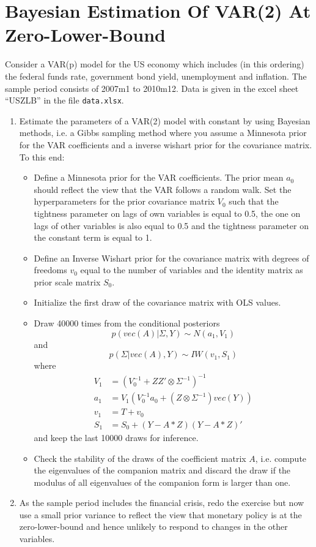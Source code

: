\documentclass[a4paper]{scrartcl}
\begin{document}
\section{Bayesian Estimation Of VAR(2) At Zero-Lower-Bound}
Consider a VAR(p) model for the US economy which includes (in this ordering) the federal funds rate, government bond yield, unemployment and inflation. The sample period consists of 2007m1 to 2010m12. Data is given in the excel sheet \enquote{USZLB} in the file \texttt{data.xlsx}.\\
\begin{enumerate}
	\item Estimate the parameters of a VAR(2) model with constant by using Bayesian methods, i.e. a Gibbs sampling method where you assume a Minnesota prior for the VAR coefficients and a inverse wishart prior for the covariance matrix.\\To this end:
	\begin{itemize}
	\item Define a Minnesota prior for the VAR coefficients. The prior mean $a_0$ should reflect the view that the VAR follows a random walk. Set the hyperparameters for the prior covariance matrix $V_0$ such that the tightness parameter on lags of own variables is equal to 0.5, the one on lags of other variables is also equal to 0.5 and the tightness parameter on the constant term is equal to 1.
	\item Define an Inverse Wishart prior for the covariance matrix with degrees of freedoms $v_0$ equal to the number of variables and the identity matrix as prior scale matrix $S_0$. 
	\item Initialize the first draw of the covariance matrix with OLS values.
	\item Draw 40000 times from the conditional posteriors $$p(vec(A)|\Sigma,Y) \sim N(a_1,V_1)$$ and $$p(\Sigma|vec(A),Y) \sim IW(v_1, S_1)$$ where
	\begin{align*}
	V_1 &= (V_0^{-1}+ZZ' \otimes \Sigma^{-1})^{-1}\\
	a_1 &= V_1 (V_0^{-1}a_0 + (Z \otimes \Sigma^{-1})vec(Y))\\
	v_1 &= T + v_0\\
	S_1 &= S_0 + (Y - A*Z)(Y - A*Z)'
	\end{align*}
	and keep the last 10000 draws for inference. 
	\item Check the stability of the draws of the coefficient matrix $A$, i.e. compute the eigenvalues of the companion matrix and discard the draw if the modulus of all eigenvalues of the companion form is larger than one.
	\end{itemize}
	\item As the sample period includes the financial crisis, redo the exercise but now use a small prior variance to reflect the view that monetary policy is at the zero-lower-bound and hence unlikely to respond to changes in the other variables.	
\end{enumerate} 
\newpage
\end{document}
